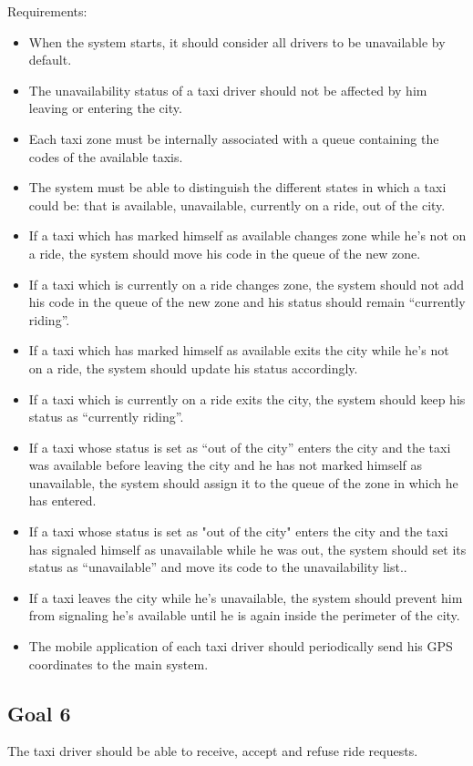Requirements:
\begin{itemize}
\item When the system starts, it should consider all drivers to be unavailable by default.
\item The unavailability status of a taxi driver should not be affected by him leaving or entering the city.
\item Each taxi zone must be internally associated with a queue containing the codes of the available taxis.
\item The system must be able to distinguish the different states in which a taxi could be: that is available, unavailable, currently on a ride, out of the city.
\item If a taxi which has marked himself as available changes zone while he's not on a ride, the system should move his code in the queue of the new zone.
\item If a taxi which is currently on a ride changes zone, the system should not add his code in the queue of the new zone and his status should remain ``currently riding''.
\item If a taxi which has marked himself as available exits the city while he's not on a ride, the system should update his status accordingly.
\item If a taxi which is currently on a ride exits the city, the system should keep his status as ``currently riding''. 
\item If a taxi whose status is set as ``out of the city'' enters the city and the taxi was available before leaving the city and he has not marked himself as unavailable, the system should assign it to the queue of the zone in which he has entered.
\item If a taxi whose status is set as "out of the city" enters the city and the taxi has signaled himself as unavailable while he was out, the system should set its status as ``unavailable'' and move its code to the unavailability list.. 
\item If a taxi leaves the city while he's unavailable, the system should prevent him from signaling he's available until he is again inside the perimeter of the city.
\item The mobile application of each taxi driver should periodically send his GPS coordinates to the main system. 
\end{itemize}


\subsection{Goal 6}
The taxi driver should be able to receive, accept and refuse ride requests.

